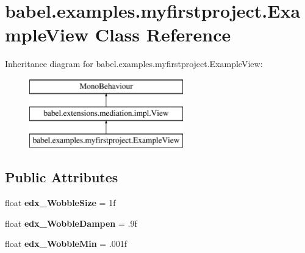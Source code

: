 \hypertarget{classbabel_1_1examples_1_1myfirstproject_1_1_example_view}{\section{babel.\-examples.\-myfirstproject.\-Example\-View Class Reference}
\label{classbabel_1_1examples_1_1myfirstproject_1_1_example_view}
}
Inheritance diagram for babel.\-examples.\-myfirstproject.\-Example\-View\-:\begin{figure}[H]
\begin{center}
\leavevmode
\includegraphics[height=3.000000cm]{classbabel_1_1examples_1_1myfirstproject_1_1_example_view}
\end{center}
\end{figure}
\subsection*{Public Attributes}
\begin{DoxyCompactItemize}
\item 
\hypertarget{classbabel_1_1examples_1_1myfirstproject_1_1_example_view_a39f263435cc239902f4df3e281accd5b}{float {\bfseries edx\-\_\-\-Wobble\-Size} = 1f}\label{classbabel_1_1examples_1_1myfirstproject_1_1_example_view_a39f263435cc239902f4df3e281accd5b}

\item 
\hypertarget{classbabel_1_1examples_1_1myfirstproject_1_1_example_view_a5f637a564c1af711b9ec29b2590d63ab}{float {\bfseries edx\-\_\-\-Wobble\-Dampen} = .\-9f}\label{classbabel_1_1examples_1_1myfirstproject_1_1_example_view_a5f637a564c1af711b9ec29b2590d63ab}

\item 
\hypertarget{classbabel_1_1examples_1_1myfirstproject_1_1_example_view_a81a76847f42b21be821101a179397a84}{float {\bfseries edx\-\_\-\-Wobble\-Min} = .\-001f}\label{classbabel_1_1examples_1_1myfirstproject_1_1_example_view_a81a76847f42b21be821101a179397a84}

\end{DoxyCompactItemize}
